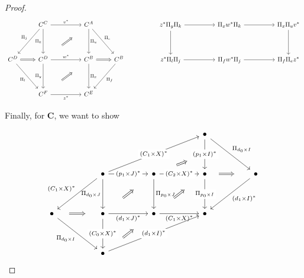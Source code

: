 \documentclass[10pt, oneside]{article}
\begin{document}
\begin{proof}
	\[\begin{tikzcd}
		& {C^C} && {C^A} &&& {z^\ast \Pi_y \Pi_k} && {\Pi_x w^\ast \Pi_k} && {\Pi_x \Pi_u v^\ast} \\
		\\
		{C^D} & {C^D} && {C^B} & {C^B} && {z^\ast \Pi_l \Pi_j} && {\Pi_f w^\ast \Pi_j} && {\Pi_f \Pi_e z^\ast} \\
		\\
		& {C^F} && {C^E}
		\arrow["{w^\ast}", from=3-2, to=3-4]
		\arrow["{\Pi_u}", from=1-4, to=3-4]
		\arrow["{v^\ast}", from=1-2, to=1-4]
		\arrow["{\Pi_k}"', from=1-2, to=3-2]
		\arrow[shorten <=22pt, shorten >=22pt, Rightarrow, from=3-2, to=1-4]
		\arrow["{\Pi_y}"', from=3-2, to=5-2]
		\arrow["{z^\ast}"', from=5-2, to=5-4]
		\arrow["{\Pi_x}", from=3-4, to=5-4]
		\arrow[shorten <=22pt, shorten >=22pt, Rightarrow, from=5-2, to=3-4]
		\arrow[from=1-9, to=1-11]
		\arrow[from=1-7, to=1-9]
		\arrow[from=3-7, to=3-9]
		\arrow[from=3-9, to=3-11]
		\arrow[from=1-11, to=3-11]
		\arrow["{\Pi_e}", from=1-4, to=3-5]
		\arrow["{\Pi_f}", from=3-5, to=5-4]
		\arrow["{\Pi_l}"', from=3-1, to=5-2]
		\arrow["{\Pi_j}"', from=1-2, to=3-1]
		\arrow[Rightarrow, from=3-4, to=3-5]
		\arrow[Rightarrow, from=3-1, to=3-2]
		\arrow[from=1-7, to=3-7]
	\end{tikzcd}\]
	
	Finally, for $\mathbf{C}$, we want to show
	
	\[\begin{tikzcd}
		&&&&&& \bullet \\
		\\
		&& \bullet && \bullet && \bullet && \bullet \\
		\\
		\bullet && \bullet && \bullet && \bullet \\
		\\
		&& \bullet
		\arrow["{(d_1 \times J)^\ast}"', from=5-3, to=5-5]
		\arrow["{(C_1 \times X)^\ast}"', from=5-5, to=5-7]
		\arrow["{\Pi_{d_0 \times J}}"', from=3-3, to=5-3]
		\arrow["{\Pi_{p_0 \times J}}", from=3-5, to=5-5]
		\arrow["{\Pi_{p_0 \times I}}"{description}, from=3-7, to=5-7]
		\arrow["{(p_1 \times J)^\ast}"{description}, from=3-3, to=3-5]
		\arrow["{(C_2 \times X)^\ast}"{description}, from=3-5, to=3-7]
		\arrow[shorten <=22pt, shorten >=22pt, Rightarrow, from=5-3, to=3-5]
		\arrow[shorten <=22pt, shorten >=22pt, Rightarrow, from=5-5, to=3-7]
		\arrow["{(C_1 \times X)^\ast}"{description}, from=3-3, to=1-7]
		\arrow[""{name=0, anchor=center, inner sep=0}, "{(p_1 \times I)^\ast}"{description}, from=1-7, to=3-7]
		\arrow["{\Pi_{d_0 \times I}}", from=1-7, to=3-9]
		\arrow["{(d_1 \times I)^\ast}", from=3-9, to=5-7]
		\arrow[shorten <=10pt, shorten >=19pt, Rightarrow, from=3-7, to=3-9]
		\arrow["{(C_0 \times X)^\ast}"{description}, from=5-3, to=7-3]
		\arrow["{(d_1 \times I)^\ast}"{description}, from=7-3, to=5-7]
		\arrow["{\Pi_{d_0 \times I}}"', from=5-1, to=7-3]
		\arrow["{(C_1 \times X)^\ast}"', from=3-3, to=5-1]
		\arrow[shorten <=14pt, shorten >=14pt, Rightarrow, from=5-1, to=5-3]
		\arrow[shorten <=22pt, shorten >=22pt, Rightarrow, from=7-3, to=5-5]
		\arrow[shorten <=22pt, shorten >=22pt, Rightarrow, from=3-5, to=0]
	\end{tikzcd}\]
	

\end{proof}
\end{document}
